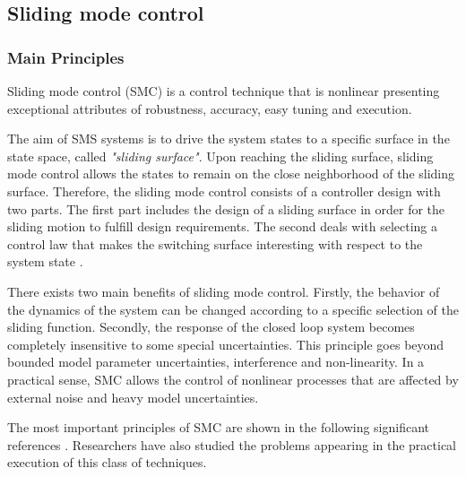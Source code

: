 \documentclass{thesisreport}
\begin{document}





 \subsection{Sliding mode control}
 
 
 
  \subsubsection{Main Principles}
 
 
 
Sliding mode control (SMC) is a control technique that is nonlinear presenting exceptional attributes of robustness,
accuracy, easy tuning and execution.
 
The aim of SMS systems is to drive the system states to a specific surface in the state space, called  \textit{"sliding surface"}. Upon reaching the sliding surface, sliding mode control allows the states to remain on the close neighborhood of the sliding surface. Therefore, the sliding mode control consists of a controller design with two parts. The first part includes the design of a sliding surface in order for the sliding motion to fulfill design requirements. The second deals with selecting a control law that makes the switching surface interesting with respect to the system state \cite{Utkin1997}.

There exists two main benefits of sliding mode control. Firstly, the behavior of the dynamics of the system can be changed according to a specific selection of the sliding function. Secondly, the response of the closed loop system becomes completely insensitive to some special uncertainties. This principle goes beyond bounded model parameter uncertainties, interference and non-linearity. In a practical sense, SMC allows the control of nonlinear processes that are affected by external noise and heavy model uncertainties.

The most important principles of SMC are shown in the following significant references \cite{Utkin1997,DeCarlo1998,Hung1993}. Researchers have also studied the problems appearing in the practical execution of this class of techniques. \cite{Young1999}
\end{document}

